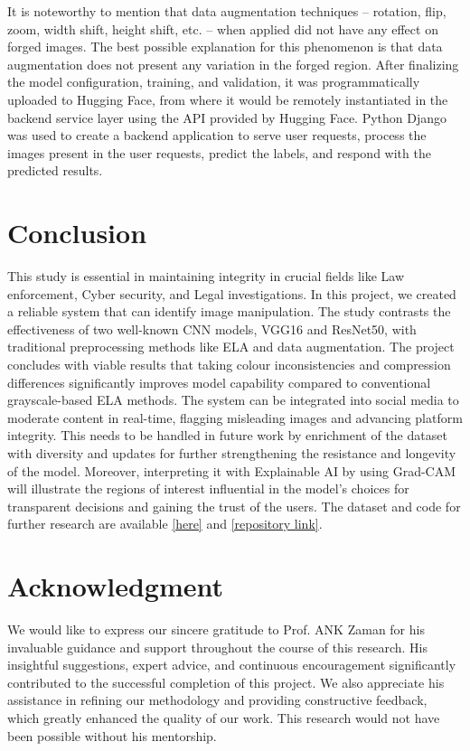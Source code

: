 \documentclass{ieeeaccess}
\begin{document}
 It is noteworthy to mention that data augmentation techniques – rotation, flip, zoom, width shift, height shift, etc. – when applied did not have any effect on forged images. The best possible explanation for this phenomenon is that data augmentation does not present any variation in the forged region. After finalizing the model configuration, training, and validation, it was programmatically uploaded to Hugging Face, from where it would be remotely instantiated in the backend service layer using the API provided by Hugging Face. Python Django was used to create a backend application to serve user requests, process the images present in the user requests, predict the labels, and respond with the predicted results.
  
\section{Conclusion}
This study is essential in maintaining integrity in crucial fields like Law enforcement, Cyber security, and Legal investigations. In this project, we created a reliable system that can identify image manipulation. The study contrasts the effectiveness of two well-known CNN models, VGG16 and ResNet50, with traditional preprocessing methods like ELA and data augmentation. The project concludes with viable results that taking colour inconsistencies and compression differences significantly improves model capability compared to conventional grayscale-based ELA methods. The system can be integrated into social media to moderate content in real-time, flagging misleading images and advancing platform integrity. This needs to be handled in future work by enrichment of the dataset with diversity and updates for further strengthening the resistance and longevity of the model. Moreover, interpreting it with Explainable AI by using Grad-CAM will illustrate the regions of interest influential in the model's choices for transparent decisions and gaining the trust of the users.
The dataset and code for further research are available \href{https://www.kaggle.com/datasets/divg07/casia-20-image-tampering-detection-dataset/data}{[here]} and \href{https://github.com/ayaz168/veriforge}{[repository link]}.

\section*{Acknowledgment}
We would like to express our sincere gratitude to Prof. ANK Zaman for his invaluable guidance and support throughout the course of this research. His insightful suggestions, expert advice, and continuous encouragement significantly contributed to the successful completion of this project. We also appreciate his assistance in refining our methodology and providing constructive feedback, which greatly enhanced the quality of our work. This research would not have been possible without his mentorship.
\end{document}
